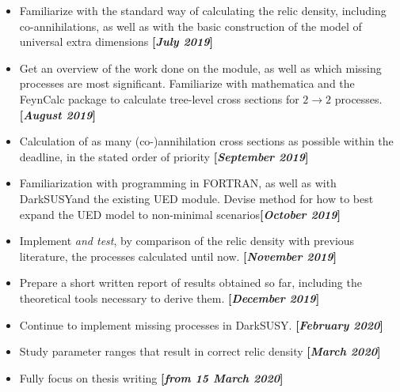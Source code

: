 \documentclass[12pt,a4paper]{article}
\newcommand{\ds}{{\sf DarkSUSY}}
\begin{document}
\begin{itemize}
\item Familiarize with the standard way of calculating the relic density, including co-annihilations,
as well as with the basic construction of the model of universal extra dimensions {\scriptsize \bf [\emph{July 2019}]}

\item Get an overview of the work done on the module, as well as which missing processes are most significant. Familiarize with mathematica and the FeynCalc package to calculate 
tree-level cross sections for $2\to2$ processes.  {\scriptsize \bf [\emph{August 2019}]}

\item Calculation of as many (co-)annihilation cross sections as possible within the deadline, 
in the stated order of priority {\scriptsize \bf [\emph{September 2019}]}

\item Familiarization with programming in FORTRAN, as well as with \ds and the existing UED module. Devise method for how to
best expand the UED model to non-minimal scenarios{\scriptsize \bf [\emph{October 2019}]}

\item Implement {\it and test}, by comparison of the relic density with previous literature, the processes
calculated until now. 
 {\scriptsize \bf [\emph{November 2019}]}

\item Prepare a short written report of results obtained so far, including the theoretical tools necessary 
to derive them. {\scriptsize \bf [\emph{December 2019}]}
\item Continue to implement missing processes in \ds. {\scriptsize \bf [\emph{February 2020}]}
\item Study parameter ranges that result in correct relic density {\scriptsize \bf [\emph{March 2020}]}
\item Fully focus on thesis writing {\scriptsize \bf [\emph{from 15 March 2020}]}
\end{itemize}



\end{document}
